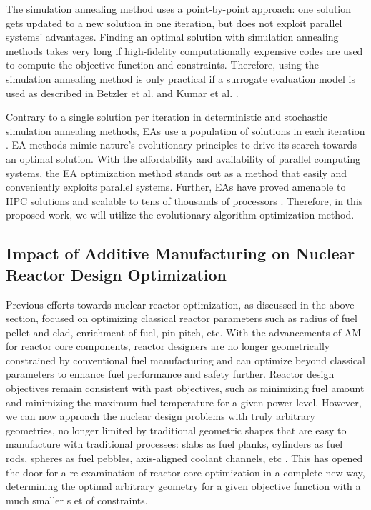 The simulation annealing method uses a point-by-point approach:
one solution gets updated to a new solution in one iteration, but does not 
exploit parallel systems' advantages.
Finding an optimal solution with simulation annealing methods takes very 
long if high-fidelity computationally expensive codes are used to compute 
the objective function and constraints.
Therefore, using the simulation annealing method is only practical if a 
surrogate evaluation model is used as described in Betzler et al. 
\cite{betzler_design_2019} and Kumar et al. \cite{kumar_new_2015}.

Contrary to a single solution per iteration in deterministic and stochastic 
simulation annealing methods, \glspl{EA} use a population of solutions in each 
iteration \cite{deb_multi-objective_2001}. 
\gls{EA} methods mimic nature's evolutionary principles to drive 
its search towards an optimal solution. 
With the affordability and availability of parallel computing systems, the 
\gls{EA} optimization method stands out as a method 
that easily and conveniently exploits parallel systems. 
Further, \glspl{EA} have proved amenable to \gls{HPC} solutions and 
scalable to tens of thousands of processors \cite{kropaczek_constraint_2019}. 
Therefore, in this proposed work, we will utilize the evolutionary algorithm 
optimization method. 

\subsection{Impact of Additive Manufacturing on Nuclear Reactor Design 
Optimization}
Previous efforts towards nuclear reactor optimization, as discussed in the above 
section, focused on optimizing classical reactor parameters such as 
radius of fuel pellet and clad, enrichment of fuel, pin pitch, etc. 
With the advancements of \gls{AM} for reactor core components, reactor designers 
are no longer geometrically constrained by conventional fuel manufacturing and 
can optimize beyond classical parameters to enhance fuel performance and safety 
further. 
Reactor design objectives remain consistent with past objectives, such as 
minimizing fuel amount and minimizing the maximum fuel temperature for a given 
power level.
However, we can now approach the nuclear design problems with truly arbitrary 
geometries, no longer limited by traditional geometric shapes that are 
easy to manufacture with traditional processes: slabs as fuel planks, cylinders 
as fuel rods, spheres as fuel pebbles, axis-aligned coolant channels, etc  
\cite{sobes_artificial_2020}.
This has opened the door for a re-examination of reactor core 
optimization in a complete new way, determining the optimal arbitrary geometry 
for a given objective function \cite{sobes_artificial_2020} with a much smaller s
et of constraints. 

